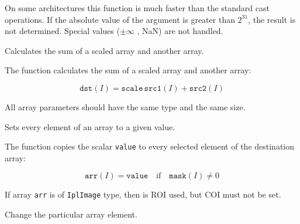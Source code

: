 On some architectures this function is much faster than the standard cast
operations. If the absolute value of the argument is greater than
$2^{31}$, the result is not determined. Special values ($\pm \infty$ , NaN)
are not handled.

\fi


Calculates the sum of a scaled array and another array.


\begin{description}
\end{description}

The function calculates the sum of a scaled array and another array:

\[
\texttt{dst}(I)=\texttt{scale} \, \texttt{src1}(I) + \texttt{src2}(I)
\]

All array parameters should have the same type and the same size.

Sets every element of an array to a given value.


\begin{description}
\end{description}


The function copies the scalar \texttt{value} to every selected element of the destination array:

\[
\texttt{arr}(I)=\texttt{value} \quad \text{if} \quad \texttt{mask}(I) \ne 0
\]

If array \texttt{arr} is of \texttt{IplImage} type, then is ROI used, but COI must not be set.

\ifC %
Change the particular array element.


